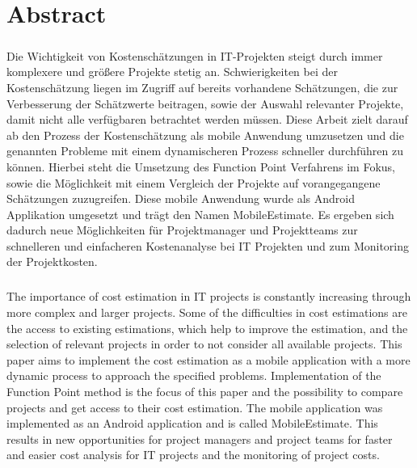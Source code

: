 

\chapter*{Abstract}

\paragraph*{}
Die Wichtigkeit von Kostenschätzungen in IT-Projekten steigt durch immer komplexere und größere Projekte stetig an. Schwierigkeiten bei der Kostenschätzung liegen im Zugriff auf bereits vorhandene Schätzungen, die zur Verbesserung der Schätzwerte beitragen, sowie der Auswahl relevanter Projekte, damit nicht alle verfügbaren betrachtet werden müssen. Diese Arbeit zielt darauf ab den Prozess der Kostenschätzung als mobile Anwendung umzusetzen und die genannten Probleme mit einem dynamischeren Prozess schneller durchführen zu können. Hierbei steht die Umsetzung des Function Point Verfahrens im Fokus, sowie die Möglichkeit mit einem Vergleich der Projekte auf vorangegangene Schätzungen zuzugreifen. Diese mobile Anwendung wurde als Android Applikation umgesetzt und trägt den Namen MobileEstimate. Es ergeben sich dadurch neue Möglichkeiten für Projektmanager und Projektteams zur schnelleren und einfacheren Kostenanalyse bei IT Projekten und zum Monitoring der Projektkosten.

\paragraph*{}
The importance of cost estimation in IT projects is constantly increasing through more complex and larger projects. Some of the difficulties in cost estimations are the access to existing estimations, which help to improve the estimation, and the selection of relevant projects in order to not consider all available projects. This paper aims to implement the cost estimation as a mobile application with a more dynamic process to approach the specified problems. Implementation of the Function Point method is the focus of this paper and the possibility to compare projects and get access to their cost estimation. The mobile application was implemented as an Android application and is called MobileEstimate. This results in new opportunities for project managers and project teams for faster and easier cost analysis for IT projects and the monitoring of project costs.

